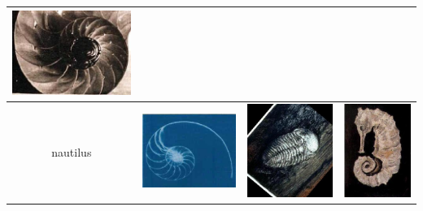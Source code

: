 \documentclass{article}
\begin{document}
\begin{table}[Ht]
\begin{tabular}{| c | c | c | c |}
\vspace{0cm}\includegraphics[scale=.15]{"Figures/False Matches/class_1_least_sure_wrong"} \\
\hline
nautilus &
\vspace{0cm}\includegraphics[scale=.15]{"Figures/Best Matches/bestmatch_c2"} &
\vspace{0cm}\includegraphics[scale=.15]{"Figures/False Matches/class_2_most_sure_wrong"} &
\vspace{0cm}\includegraphics[scale=.15]{"Figures/False Matches/class_2_least_sure_wrong"} \\

\end{tabular}
\end{table}
\end{document}
